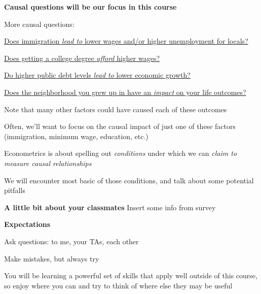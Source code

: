 \documentclass[11pt, aspectratio=169]{beamer}
\newenvironment{wideitemize}{\itemize\addtolength{\itemsep}{5pt}}{\enditemize}
\newenvironment{wideenumerate}{\enumerate\addtolength{\itemsep}{5pt}}{\endenumerate}
\begin{document}
\begin{frame}{\bf \large Causal questions will be our focus in this course}
	\begin{wideitemize}
		\item[] More causal questions:
\begin{wideenumerate}
	\item \href{http://davidcard.berkeley.edu/papers/mariel-impact.pdf}{Does immigration \emph{lead to} lower wages and/or higher unemployment for locals? }
	
	\item \href{http://davidcard.berkeley.edu/papers/causal_educ_earnings.pdf}{Does getting a college degree \emph{afford} higher wages? }
	
	\item \href{https://www.imf.org/external/pubs/ft/wp/2014/wp1434.pdf}{Do higher public debt levels \emph{lead to} lower economic growth? }
	\item \href{https://academic.oup.com/qje/article/133/3/1107/4850660}{ Does the
		neighborhood you grew up in have an \emph{impact} on your life outcomes?}
\end{wideenumerate}

\pause 

			\item Note that many other factors could have caused each of these outcomes
			\item Often, we’ll want to focus on the causal impact of just one of these factors (immigration, minimum wage, education, etc.)
			\item Econometrics is about spelling out \textit{conditions} under which we can \textit{claim to measure causal relationships}
			\item We will encounter most basic of those conditions, and talk about some potential pitfalls

	\end{wideitemize}
\end{frame}

\begin{frame}{\bf \large A little bit about your classmates}
	Insert some info from survey
	
\end{frame}

\begin{frame}{\bf \large Expectations}
	\begin{wideitemize}
		\item Ask questions: to me, your TAs, each other
		\item Make mistakes, but always try
		\item You will be learning a powerful set of skills that apply well outside of this course, so enjoy where you can and try to think of where else they may be useful
	\end{wideitemize}
\end{frame}
\end{document}
